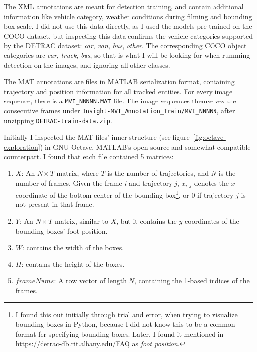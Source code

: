 The XML annotations are meant for detection training, and contain additional information like vehicle category, weather conditions during filming and bounding box scale. I did not use this data directly, as I used the models pre-trained on the COCO dataset, but inspecting this data confirms the vehicle categories supported by the DETRAC dataset: \textit{car}, \textit{van}, \textit{bus}, \textit{other}. The corresponding COCO object categories are \textit{car}, \textit{truck}, \textit{bus}, so that is what I will be looking for when runnning detection on the images, and ignoring all other classes.

The MAT annotations are files in MATLAB serialization format, containing trajectory and position information for all tracked entities. For every image sequence, there is a \verb|MVI_NNNNN.MAT| file.
The image sequences themselves are consecutive frames under \verb|Insight-MVT_Annotation_Train/MVI_NNNNN|, after unzipping \verb|DETRAC-train-data.zip|.

Initially I inspected the MAT files' inner structure (see figure~\ref{fig:octave-exploration}) in GNU Octave, MATLAB's open-source and somewhat compatible counterpart. I found that each file contained 5 matrices:
\begin{enumerate}
    \item{$X$: An $N \times T$ matrix, where $T$ is the number of trajectories, and $N$ is the number of frames. Given the frame $i$ and trajectory $j$, $x_{i,j}$ denotes the $x$ coordinate of the bottom center of the bounding box\footnote{I found this out initially through trial and error, when trying to visualize bounding boxes in Python, because I did not know this to be a common format for specifying bounding boxes. Later, I found it mentioned in \url{https://detrac-db.rit.albany.edu/FAQ} as \textit{foot position}.}, or $0$ if trajectory $j$ is not present in that frame.}
    \item{$Y$: An $N \times T$ matrix, similar to $X$, but it contains the $y$ coordinates of the bounding boxes' foot position.}
    \item{$W$: contains the width of the boxes.}
    \item{$H$: contains the height of the boxes.}
    \item{$frameNums$: A row vector of length $N$, containing the 1-based indices of the frames.}
\end{enumerate}

